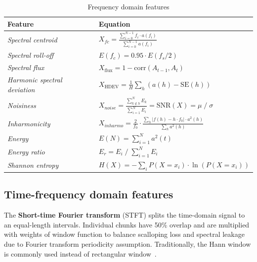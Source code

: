 \begin{table}[ht]
\renewcommand{\arraystretch}{2}
\centering
\begin{tabular}{|l|l|}
\hline
\textbf{Feature}           & \textbf{Equation}                                                                                                  \\ \hline
\textit{Spectral centroid} & $ X_{fc} = \frac{\sum_{i = 0}^{N - 1}{f_i \cdot a(f_i)}}{\sum_{i = 0}^{N - 1}{a(f_i)}}$                   \\ \hline 
\textit{Spectral roll-off} & $ E(f_c) = 0.95 \cdot E(f_s / 2) $                                                   \\ \hline
\textit{Spectral flux}     & $X_{\mathrm{flux}} = 1 - \mathrm{corr}(A_{t-1}, A_t)$ \\ \hline 
\textit{Harmonic spectral deviation} & $ X_{\mathrm{HDEV}} = \frac{1}{H}\sum_h(a(h) - \mathrm{SE}(h))$                                          \\ \hline
\textit{Noisiness}                   & $X_{noise} = \frac{\sum_{k \notin h}^{N}E_k}{\sum_{i = 1}^{N}E_i} = \mathrm{SNR}(X) = \mu \;/\; \sigma $                             \\ \hline
\textit{Inharmonicity}               & $X_{inharmo} = \frac{2}{f_0} \cdot \frac{\sum_h | f(h) - h \cdot f_0| \cdot a^2(h)}{\sum_h a^2(h)} $ \\ \hline
\textit{Energy}            & $ E(N) = \sum_{i = 1}^{N} a^2(t) $                                                                    \\ \hline \textit{Energy ratio}                & $E_r = E_i \;/\; \sum_{i = 1}^{N}{E_i} $                                                        \\ \hline
\textit{Shannon entropy}      & $H(X) = - \sum_{i} P(X = x_i) \cdot \ln(P(X = x_i)) $                                                  \\ \hline
\end{tabular}
\caption{Frequency domain features}
\label{tab:fd-features}
\end{table}

\subsection{Time-frequency domain features}
The \textbf{Short-time Fourier transform} (STFT) splits the time-domain signal to an equal-length intervals. Individual chunks have 50\% overlap and are multiplied with weights of window function to balance scalloping loss and spectral leakage due to Fourier transform periodicity assumption. Traditionally, the Hann window is commonly used instead of rectangular window~\cite{ziaran_technicka_2013,noauthor_iso_2016_2}.

